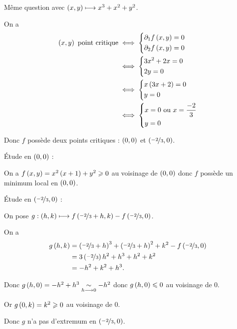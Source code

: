 \begin{exo}
Même question avec \(\left(x,y\right)\longmapsto x^3+x^2+y^2\).
\end{exo}

\begin{corr}
On a \[\begin{aligned}
\paren{x,y}\text{ point critique}&\ssi\begin{dcases}
\pdif{1}f\paren{x,y}=0 \\
\pdif{2}f\paren{x,y}=0
\end{dcases} \\
&\ssi\begin{dcases}
3x^2+2x=0 \\
2y=0
\end{dcases} \\
&\ssi\begin{dcases}
x\paren{3x+2}=0 \\
y=0
\end{dcases} \\
&\ssi\begin{dcases}
x=0\text{ ou }x=\dfrac{-2}{3} \\
y=0
\end{dcases}
\end{aligned}\]

Donc \(f\) possède deux points critiques : \(\left(0,0\right)\) et \(\left(\nicefrac{-2}{3},0\right)\).

Étude en \(\left(0,0\right)\) :

On a \(f\left(x,y\right)=x^2\left(x+1\right)+y^2\geqslant0\) au voisinage de \(\left(0,0\right)\) donc \(f\) possède un minimum local en \(\left(0,0\right)\).

Étude en \(\left(\nicefrac{-2}{3},0\right)\) :

On pose \(g:\left(h,k\right)\longmapsto f\left(\nicefrac{-2}{3}+h,k\right)-f\left(\nicefrac{-2}{3},0\right)\).

On a \[\begin{aligned}
g\left(h,k\right)&=\left(\nicefrac{-2}{3}+h\right)^3+\left(\nicefrac{-2}{3}+h\right)^2+k^2-f\left(\nicefrac{-2}{3},0\right) \\
&=3\left(\nicefrac{-2}{3}\right)h^2+h^3+h^2+k^2 \\
&=-h^2+k^2+h^3.
\end{aligned}\]

Donc \(g\left(h,0\right)=-h^2+h^3\underset{h\longrightarrow0}{\sim}-h^2\) donc \(g\left(h,0\right)\leqslant0\) au voisinage de \(0\).

Or \(g\left(0,k\right)=k^2\geqslant0\) au voisinage de \(0\).

Donc \(g\) n'a pas d'extremum en \(\left(\nicefrac{-2}{3},0\right)\).
\end{corr}

